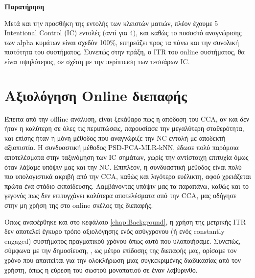 \documentclass[11pt,a4paper,english,greek,twoside]{../Thesis}
\begin{document}
\textbf{Παρατήρηση}
\par Μετά και την προσθήκη της εντολής των κλειστών ματιών, πλέον έχουμε 5 Intentional Control (IC) εντολές (αντί για 4), και καθώς το ποσοστό αναγνώρισης των alpha κυμάτων είναι σχεδόν 100\%, επηρεάζει προς τα πάνω και την συνολική πιστότητα του συστήματος. Συνεπώς στην πράξη, ο ITR του οnline συστήματος, θα είναι υψηλότερος, σε σχέση με την περίπτωση των τεσσάρων IC.

\section{Αξιολόγηση Online διεπαφής}

\par Έπειτα από την offline ανάλυση, είναι ξεκάθαρο πως η απόδοση του CCA, αν και δεν ήταν η καλύτερη σε όλες τις περιπτώσεις, παρουσίασε την μεγαλύτερη σταθερότητα, και επίσης ήταν η μόνη μέθοδος που αναγνώριζε την NC εντολή με αποδεκτή αξιοπιστία. Η συνδυαστική μέθοδος PSD-PCA-MLR-kNN, έδωσε πολύ παρόμοια αποτελέσματα στην ταξινόμηση των IC σημάτων, χωρίς την αντίστοιχη επιτυχία όμως όταν λάβαμε υπόψιν μας και την NC. Επιπλέον, η συνδυαστική μέθοδος είναι πολύ πιο υπολογιστικά ακριβή από την CCA, καθώς και λιγότερο ευέλικτη, αφού χρειάζεται πρώτα ένα στάδιο εκπαίδευσης. Λαμβάνοντας υπόψιν μας τα παραπάνω, καθώς και το γεγονός πως δεν επιτυγχάνει καλύτερα αποτελέσματα από την CCA, μας οδήγησε στην μη χρήση της στο online σκέλος της διεπαφής.

\par Όπως αναφέρθηκε και στο κεφάλαιο \ref{chap:Background}, η χρήση της μετρικής ITR δεν αποτελεί έγκυρο τρόπο αξιολόγησης ενός ασύγχρονου (ή ενός constantly engaged) συστήματος πραγματικού χρόνου όπως αυτό που υλοποιήσαμε. Συνεπώς, σύμφωνα με την δημοσίευση, \cite{Yuan2013-jp}, ως μέτρο επίδοσης της διεπαφής μας, ορίσαμε τον χρόνο που απαιτείται για την ολοκλήρωση μιας συγκεκριμένης διαδικασίας από τον χρήστη, όπως η εύρεση του σωστού μονοπατιού σε έναν λαβύρινθο.
\end{document}
